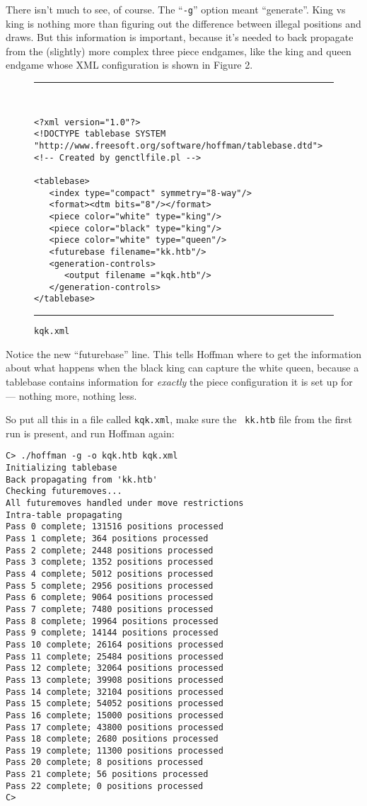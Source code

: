 \documentclass[11pt]{article}
\begin{document}
There isn't much to see, of course.  The ``{\tt -g}'' option
meant ``generate''.  King vs king is nothing more than figuring out
the difference between illegal positions and draws.  But this
information is important, because it's needed to back propagate from
the (slightly) more complex three piece endgames, like the king and
queen endgame whose XML configuration is shown in Figure 2.

\begin{figure}
\hrule\ 
{\small\begin{verbatim}
<?xml version="1.0"?>
<!DOCTYPE tablebase SYSTEM "http://www.freesoft.org/software/hoffman/tablebase.dtd">
<!-- Created by genctlfile.pl -->

<tablebase>
   <index type="compact" symmetry="8-way"/>
   <format><dtm bits="8"/></format>
   <piece color="white" type="king"/>
   <piece color="black" type="king"/>
   <piece color="white" type="queen"/>
   <futurebase filename="kk.htb"/>
   <generation-controls>
      <output filename ="kqk.htb"/>
   </generation-controls>
</tablebase>
\end{verbatim}}
\hrule
\caption{\tt kqk.xml}
\end{figure}

Notice the new ``futurebase'' line.  This tells Hoffman where to get
the information about what happens when the black king can capture the
white queen, because a tablebase contains information for {\it
exactly} the piece configuration it is set up for --- nothing
more, nothing less.

So put all this in a file called {\tt kqk.xml}, make sure the {\tt
kk.htb} file from the first run is present, and run Hoffman again:

\begin{verbatim}
C> ./hoffman -g -o kqk.htb kqk.xml
Initializing tablebase
Back propagating from 'kk.htb'
Checking futuremoves...
All futuremoves handled under move restrictions
Intra-table propagating
Pass 0 complete; 131516 positions processed
Pass 1 complete; 364 positions processed
Pass 2 complete; 2448 positions processed
Pass 3 complete; 1352 positions processed
Pass 4 complete; 5012 positions processed
Pass 5 complete; 2956 positions processed
Pass 6 complete; 9064 positions processed
Pass 7 complete; 7480 positions processed
Pass 8 complete; 19964 positions processed
Pass 9 complete; 14144 positions processed
Pass 10 complete; 26164 positions processed
Pass 11 complete; 25484 positions processed
Pass 12 complete; 32064 positions processed
Pass 13 complete; 39908 positions processed
Pass 14 complete; 32104 positions processed
Pass 15 complete; 54052 positions processed
Pass 16 complete; 15000 positions processed
Pass 17 complete; 43800 positions processed
Pass 18 complete; 2680 positions processed
Pass 19 complete; 11300 positions processed
Pass 20 complete; 8 positions processed
Pass 21 complete; 56 positions processed
Pass 22 complete; 0 positions processed
C>
\end{verbatim}
\end{document}
